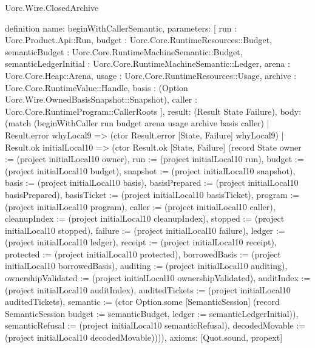 \begin{lexlean}{Uorc.Wire.ClosedArchive}
\begin{semanticmodule}
definition{
  name: beginWithCallerSemantic,
  parameters: [
    run : Uorc.Product.Api::Run,
    budget : Uorc.Core.RuntimeResources::Budget,
    semanticBudget : Uorc.Core.RuntimeMachineSemantic::Budget,
    semanticLedgerInitial : Uorc.Core.RuntimeMachineSemantic::Ledger,
    arena : Uorc.Core.Heap::Arena,
    usage : Uorc.Core.RuntimeResources::Usage,
    archive : Uorc.Core.RuntimeValue::Handle,
    basis : (Option Uorc.Wire.OwnedBasisSnapshot::Snapshot),
    caller : Uorc.Core.RuntimeProgram::CallerRoots
  ],
  result: (Result State Failure),
  body: (match (beginWithCaller run budget arena usage archive basis caller)
    | Result.error whyLocal9 => (ctor Result.error [State, Failure] whyLocal9)
    | Result.ok initialLocal10 => (ctor Result.ok [State, Failure] (record State {owner := (project initialLocal10 owner), run := (project initialLocal10 run), budget := (project initialLocal10 budget), snapshot := (project initialLocal10 snapshot), basis := (project initialLocal10 basis), basisPrepared := (project initialLocal10 basisPrepared), basisTicket := (project initialLocal10 basisTicket), program := (project initialLocal10 program), caller := (project initialLocal10 caller), cleanupIndex := (project initialLocal10 cleanupIndex), stopped := (project initialLocal10 stopped), failure := (project initialLocal10 failure), ledger := (project initialLocal10 ledger), receipt := (project initialLocal10 receipt), protected := (project initialLocal10 protected), borrowedBasis := (project initialLocal10 borrowedBasis), auditing := (project initialLocal10 auditing), ownershipValidated := (project initialLocal10 ownershipValidated), auditIndex := (project initialLocal10 auditIndex), auditedTickets := (project initialLocal10 auditedTickets), semantic := (ctor Option.some [SemanticSession] (record SemanticSession {budget := semanticBudget, ledger := semanticLedgerInitial})), semanticRefusal := (project initialLocal10 semanticRefusal), decodedMovable := (project initialLocal10 decodedMovable)}))),
  axioms: [Quot.sound, propext]
}


\end{semanticmodule}
\end{lexlean}
